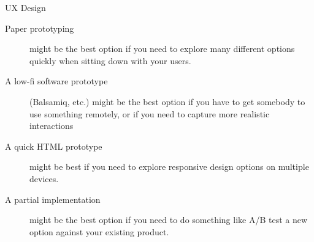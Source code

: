 UX Design

\begin{description}

	\item [Paper prototyping] might be the best option if you need to explore many different options quickly when sitting down with your users.
    \item [A low-fi software prototype] (Balsamiq, etc.) might be the best option if you have to get somebody to use something remotely, or if you need to capture more realistic interactions
    \item [A quick HTML prototype] might be best if you need to explore responsive design options on multiple devices.
    \item [A partial implementation] might be the best option if you need to do something like A/B test a new option against your existing product.
\end{description}